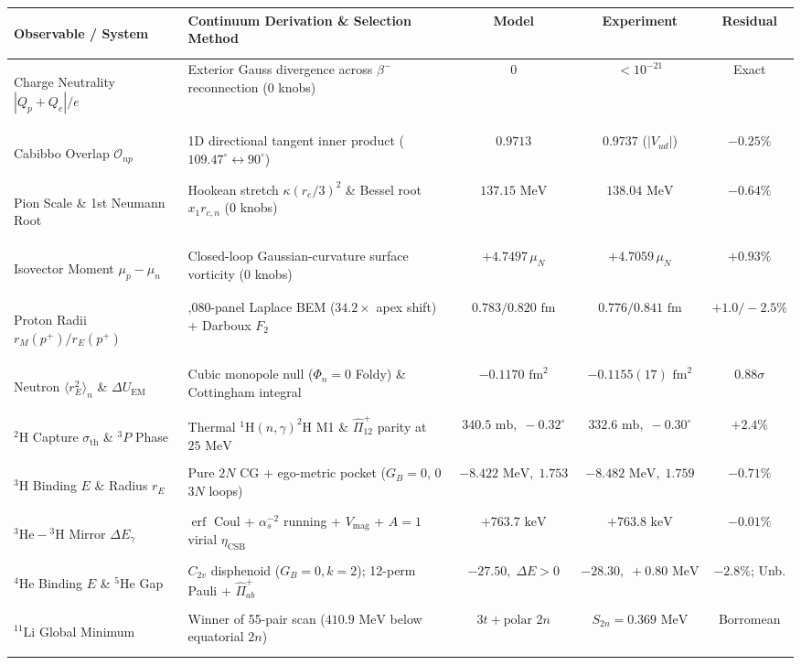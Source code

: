 \documentclass[11pt, a4paper]{article}
\begin{document}
\vspace{0.15cm}
\begin{center}
\scriptsize
\setlength{\tabcolsep}{4.0pt}
\renewcommand{\arraystretch}{1.12}
\begin{tabularx}{\textwidth}{>{\bfseries\raggedright\arraybackslash}p{} >{\raggedright\arraybackslash}X c c c}
\toprule
Observable / System & Continuum Derivation \& Selection Method & Model & Experiment & Residual \\
\midrule
Charge Neutrality $|Q_p + Q_e|/e$ & Exterior Gauss divergence across $\beta^-$ reconnection ($0$ knobs) & $0$ & $< 10^{-21}$ & Exact \\
Cabibbo Overlap $\mathcal{O}_{np}$ & 1D directional tangent inner product ($109.47^\circ\leftrightarrow 90^\circ$) & $0.9713$ & $0.9737$ ($|V_{ud}|$) & $-0.25\%$ \\
Pion Scale \& 1st Neumann Root & Hookean stretch $\kappa(r_e/3)^2$ \& Bessel root $x_1 r_{c,n}$ ($0$ knobs) & $137.15\text{ MeV}$ & $138.04\text{ MeV}$ & $-0.64\%$ \\
Isovector Moment $\mu_p - \mu_n$ & Closed-loop Gaussian-curvature surface vorticity ($0$ knobs) & $+4.7497\,\mu_N$ & $+4.7059\,\mu_N$ & $+0.93\%$ \\
Proton Radii $r_M(p^+) / r_E(p^+)$ & 1,080-panel Laplace BEM ($34.2\times$ apex shift) + Darboux $F_2$ & $0.783 / 0.820\text{ fm}$ & $0.776 / 0.841\text{ fm}$ & $+1.0 / -2.5\%$ \\
Neutron $\langle r_E^2\rangle_n$ \& $\Delta U_{\mathrm{EM}}$ & Cubic monopole null ($\Phi_n = 0$ Foldy) \& Cottingham integral & $-0.1170\text{ fm}^2$ & $-0.1155(17)\text{ fm}^2$ & $0.88\sigma$ \\
$^2\text{H}$ Capture $\sigma_{\mathrm{th}}$ \& $^3P$ Phase & Thermal $^1\text{H}(n,\gamma)^2\text{H}$ M1 \& $\hat{\Pi}_{12}^+$ parity at $25\text{ MeV}$ & $340.5\text{ mb},\; -0.32^\circ$ & $332.6\text{ mb},\; -0.30^\circ$ & $+2.4\%$ \\
$^3\text{H}$ Binding $E$ \& Radius $r_E$ & Pure $2N$ CG + ego-metric pocket ($G_B = 0$, $0$ $3N$ loops) & $-8.422\text{ MeV},\; 1.753$ & $-8.482\text{ MeV},\; 1.759$ & $-0.71\%$ \\
$^3\text{He} - {}^3\text{H}$ Mirror $\Delta E_\gamma$ & $\operatorname{erf}$ Coul + $\alpha_s^{-2}$ running + $V_{\mathrm{mag}}$ + $A=1$ virial $\eta_{\mathrm{CSB}}$ & $+763.7\text{ keV}$ & $+763.8\text{ keV}$ & $-0.01\%$ \\
$^4\text{He}$ Binding $E$ \& $^5\text{He}$ Gap & $C_{2v}$ disphenoid ($G_B=0, k=2$); 12-perm Pauli + $\hat{\Pi}_{ab}^+$ & $-27.50,\; \Delta E > 0$ & $-28.30,\; +0.80\text{ MeV}$ & $-2.8\%$; Unb. \\
$^{11}\text{Li}$ Global Minimum & Winner of 55-pair scan ($410.9\text{ MeV}$ below equatorial $2n$) & $3t + \text{polar }2n$ & $S_{2n} = 0.369\text{ MeV}$ & Borromean \\
\bottomrule
\end{tabularx}
\end{center}
\end{document}
